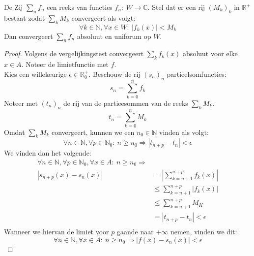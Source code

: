 \documentclass[main.tex]{subfiles}
\begin{document}
\begin{bst}
  De 
  Zij $\sum_{n}f_{n}$ een reeks van functies $f_{n}:\ W \rightarrow \mathbb{C}$.
  Stel dat er een rij $(M_{k})_{k}$ in $\mathbb{R}^{+}$ bestaat zodat $\sum_{k}M_{k}$ convergeert als volgt:
  \[ \forall k\in \mathbb{N}, \forall x \in W:\ |f_{k}(x)| < M_{k} \]
  Dan convergeert $\sum_{n}f_{n}$ absoluut en uniforum op $W$.

  \begin{proof}
    Volgens de vergelijkingstest convergeert $\sum_{k}f_{k}(x)$ absoluut voor elke $x\in A$.
    Noteer de limietfunctie met $f$.\\
    Kies een willekeurige $\epsilon \in \mathbb{R}_{0}^{+}$.
    Beschouw de rij $(s_{n})_{n}$ partieelsomfuncties:
    \[ s_{n} = \sum_{k=0}^{n}f_{k} \]
    Noteer met $(t_{n})_{n}$ de rij van de partieesommen van de reeks $\sum_{k}M_{k}$.
    \[ t_{n} = \sum_{k=0}^{n}M_{k} \]
    Omdat $\sum_{k}M_{k}$ convergeert, kunnen we een $n_{0}\in \mathbb{N}$ vinden als volgt:
    \[ \forall n \in \mathbb{N}, \forall p\in \mathbb{N}_{0}:\ n \ge n_{0} \Rightarrow |t_{n+p}-t_{n}| < \epsilon \]
    We vinden dan het volgende:
    \[
    \begin{array}{rl}
      \forall n\in \mathbb{N}, \forall p\in \mathbb{N}_{0}, \forall x\in A:\ n \ge n_{0} \Rightarrow\\
      |s_{n+p}(x) - s_{n}(x)|
      &= \left|\sum_{k=n+1}^{n+p}f_{k}(x)\right|\\
      &\le \sum_{k=n+1}^{n+p}|f_{k}(x)|\\
      &\le \sum_{k=n+1}^{n+p}M_{K}\\
      &=|t_{n+p}-t_{n}| < \epsilon\\
    \end{array}
    \]
    Wanneer we hiervan de limiet voor $p$ gaande naar $+\infty$ nemen, vinden we dit:
    \[ \forall n \in \mathbb{N}, \forall x\in A:\ n \ge n_{0} \Rightarrow |f(x)-s_{n}(x)| < \epsilon \]
  \end{proof}
\end{bst}
\end{document}
